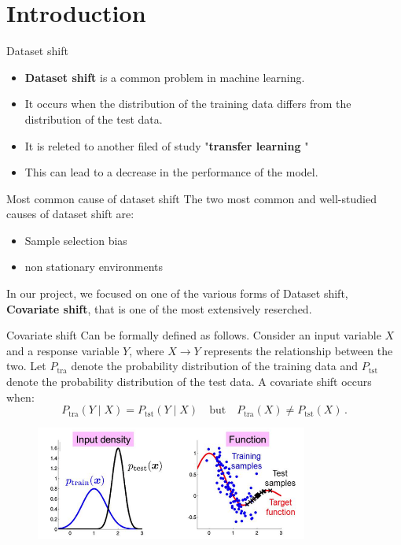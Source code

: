 \documentclass[11pt]{beamer}
\begin{document}
	

\section[Introduction]{Introduction}

\begin{frame}{Dataset shift}
\begin{itemize}
    \item \textbf{Dataset shift} is a common problem in machine learning.
    
    \item It occurs when the distribution of the training data differs from the distribution of the test data.
    
    \item It is releted to another filed of study "\textbf{transfer learning} "
    
    \item This can lead to a decrease in the performance of the model.
 \end{itemize}
\end{frame}

\begin{frame}{Most common cause of dataset shift}
The two most common and well-studied causes of dataset shift are:
\begin{itemize}
	\item Sample selection bias
		
	\item non stationary environments
\end{itemize}
\vspace{0.8cm}
In our project, we focused on one of the various forms of Dataset shift, \textbf{Covariate shift}, that is  one of the most extensively reserched.
\end{frame}

\begin{frame}{Covariate shift}
Can be formally defined as follows. Consider an input variable \( X \) and a response variable \( Y \), where \( X \to Y \) represents the relationship between the two. Let \( P_{\text{tra}} \) denote the probability distribution of the training data and \( P_{\text{tst}} \) denote the probability distribution of the test data. A covariate shift occurs when:  
\[
P_{\text{tra}}(Y \mid X) = P_{\text{tst}}(Y \mid X) \quad \text{but} \quad P_{\text{tra}}(X) \neq P_{\text{tst}}(X)\,.
\]
\begin{figure}[H]
	\centering
	\includegraphics[width=0.8\textwidth]{../assets/immagine.png} 
    \label{fig:covariate-shift}
\end{figure}
\end{frame}
\end{document}
